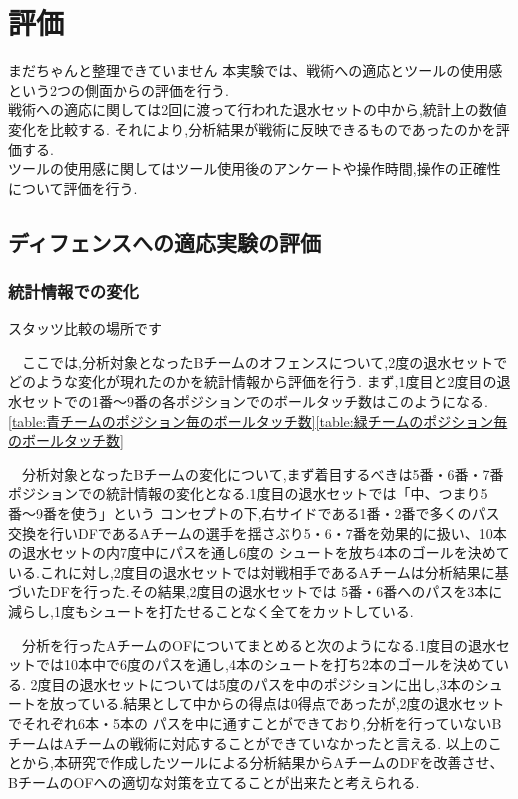 \documentclass[../main.tex]{subfiles}
\begin{document}
\chapter{評価}

まだちゃんと整理できていません
本実験では、戦術への適応とツールの使用感という2つの側面からの評価を行う.\\
戦術への適応に関しては2回に渡って行われた退水セットの中から,統計上の数値変化を比較する.
それにより,分析結果が戦術に反映できるものであったのかを評価する.\\
ツールの使用感に関してはツール使用後のアンケートや操作時間,操作の正確性について評価を行う.


\section{ディフェンスへの適応実験の評価}

\subsection{統計情報での変化}
スタッツ比較の場所です
\par　ここでは,分析対象となったBチームのオフェンスについて,2度の退水セットでどのような変化が現れたのかを統計情報から評価を行う.
まず,1度目と2度目の退水セットでの1番〜9番の各ポジションでのボールタッチ数はこのようになる.\ref{table:青チームのポジション毎のボールタッチ数}\ref{table:緑チームのポジション毎のボールタッチ数}
\par　分析対象となったBチームの変化について,まず着目するべきは5番・6番・7番ポジションでの統計情報の変化となる.1度目の退水セットでは「中、つまり5番〜9番を使う」という
コンセプトの下,右サイドである1番・2番で多くのパス交換を行いDFであるAチームの選手を揺さぶり5・6・7番を効果的に扱い、10本の退水セットの内7度中にパスを通し6度の
シュートを放ち4本のゴールを決めている.これに対し,2度目の退水セットでは対戦相手であるAチームは分析結果に基づいたDFを行った.その結果,2度目の退水セットでは
5番・6番へのパスを3本に減らし,1度もシュートを打たせることなく全てをカットしている.


\par　分析を行ったAチームのOFについてまとめると次のようになる.1度目の退水セットでは10本中で6度のパスを通し,4本のシュートを打ち2本のゴールを決めている.
2度目の退水セットについては5度のパスを中のポジションに出し,3本のシュートを放っている.結果として中からの得点は0得点であったが,2度の退水セットでそれぞれ6本・5本の
パスを中に通すことができており,分析を行っていないBチームはAチームの戦術に対応することができていなかったと言える.
以上のことから,本研究で作成したツールによる分析結果からAチームのDFを改善させ、BチームのOFへの適切な対策を立てることが出来たと考えられる.
\end{document}
